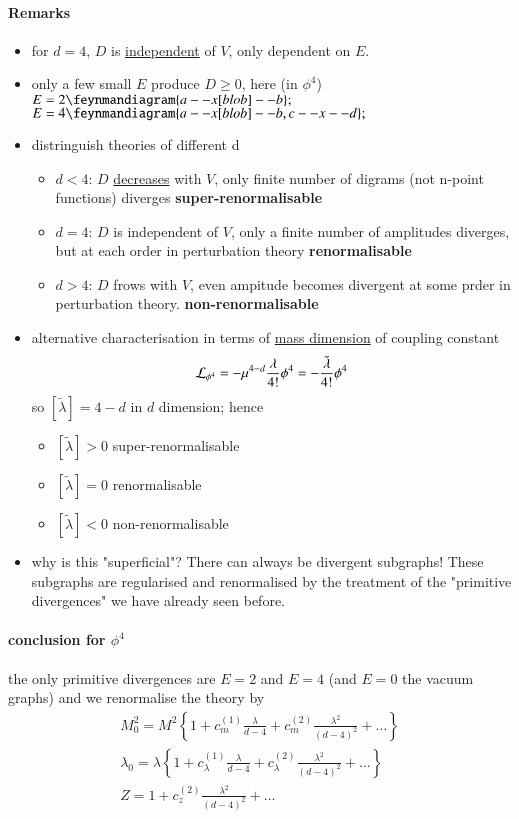 \paragraph{Remarks}
\begin{itemize}
	\item for $d=4$, $D$ is \underline{independent} of $V$, only dependent on $E$.
	\item only a few small $E$ produce $D \geq 0$, here (in $\phi^4$)
		$E = 2 \feynmandiagram{a -- x[blob] -- b};$
		$E = 4 \feynmandiagram{a -- x[blob] -- b, c -- x -- d};$
	\item distringuish theories of different d
		\begin{itemize}
			\item $d < 4$: $D$ \underline{decreases} with $V$, only finite number of digrams (not n-point functions) diverges 
				\textbf{super-renormalisable}
			\item $d=4$: $D$ is independent of $V$, only a finite number of amplitudes diverges, but at each order in perturbation theory
				\textbf{renormalisable}
			\item $d>4$: $D$ frows with $V$, even ampitude becomes divergent at some prder in perturbation theory.
				\textbf{non-renormalisable}
		\end{itemize}
	\item alternative characterisation in terms of \underline{mass dimension} of coupling constant
		\begin{align*}
			\mathcal{L}_{\phi^4} = -\mu^{4-d}\frac{\lambda}{4!} \phi^4 = - \frac{\tilde{\lambda}}{4!} \phi^4
		\end{align*}
		so $[\tilde{\lambda}] = 4-d$ in $d$ dimension; hence 
			\begin{itemize}
				\item $[\tilde{\lambda}] > 0$ super-renormalisable
				\item $[\tilde{\lambda}] = 0$ renormalisable
				\item $[\tilde{\lambda}] < 0$ non-renormalisable
			\end{itemize}
		\item why is this "superficial"? There can always be divergent subgraphs! These subgraphs are regularised and renormalised by the treatment of the "primitive divergences" we have already seen before.
\end{itemize}
\paragraph{conclusion for $\phi^4$}
the only primitive divergences are $E=2$ and $E=4$ (and $E=0$ the vacuum graphs) and we renormalise the theory by  
\begin{align}
	M_0^2 = M^2 \left\{ 1 + c_m^{(1)}\frac{\lambda}{d-4} + c_m^{(2)}\frac{\lambda^2}{(d-4)^2} + \dots \right\} \\
	\lambda_0 = \lambda \left\{ 1 + c_\lambda^{(1)}\frac{\lambda}{d-4} + c_\lambda^{(2)}\frac{\lambda^2}{(d-4)^2} + \dots \right\} \\
	Z = 1 + c_z^{(2)} \frac{\lambda^2}{(d-4)^2} + \dots
\end{align}
